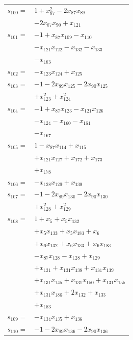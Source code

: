 \begin{longtable}{@{}r@{\;}l@{}}
\(s_{100}=\) & \(\displaystyle 1 +x_{87}^{2} -2x_{87}x_{89}\) \\
 & \(\displaystyle -2x_{87}x_{90} +x_{121}\) \\[3pt]
\(s_{101}=\) & \(\displaystyle -1 +x_{87}x_{109} -x_{110}\) \\
 & \(\displaystyle -x_{121}x_{122} -x_{132} -x_{133}\) \\
 & \(\displaystyle -x_{183}\) \\[3pt]
\(s_{102}=\) & \(\displaystyle -x_{123}x_{124} +x_{125}\) \\[3pt]
\(s_{103}=\) & \(\displaystyle -1 -2x_{89}x_{125} -2x_{90}x_{125}\) \\
 & \(\displaystyle +x_{123}^{2} +x_{124}^{2}\) \\[3pt]
\(s_{104}=\) & \(\displaystyle -1 +x_{87}x_{123} -x_{121}x_{126}\) \\
 & \(\displaystyle -x_{124} -x_{160} -x_{161}\) \\
 & \(\displaystyle -x_{167}\) \\[3pt]
\(s_{105}=\) & \(\displaystyle 1 -x_{87}x_{114} +x_{115}\) \\
 & \(\displaystyle +x_{121}x_{127} +x_{172} +x_{173}\) \\
 & \(\displaystyle +x_{178}\) \\[3pt]
\(s_{106}=\) & \(\displaystyle -x_{128}x_{129} +x_{130}\) \\[3pt]
\(s_{107}=\) & \(\displaystyle -1 -2x_{89}x_{130} -2x_{90}x_{130}\) \\
 & \(\displaystyle +x_{128}^{2} +x_{129}^{2}\) \\[3pt]
\(s_{108}=\) & \(\displaystyle 1 +x_{5} +x_{5}x_{132}\) \\
 & \(\displaystyle +x_{5}x_{133} +x_{5}x_{183} +x_{6}\) \\
 & \(\displaystyle +x_{6}x_{132} +x_{6}x_{133} +x_{6}x_{183}\) \\
 & \(\displaystyle -x_{87}x_{128} -x_{128} +x_{129}\) \\
 & \(\displaystyle +x_{131} +x_{131}x_{138} +x_{131}x_{139}\) \\
 & \(\displaystyle +x_{131}x_{145} +x_{131}x_{150} +x_{131}x_{155}\) \\
 & \(\displaystyle +x_{131}x_{186} +2x_{132} +x_{133}\) \\
 & \(\displaystyle +x_{183}\) \\[3pt]
\(s_{109}=\) & \(\displaystyle -x_{134}x_{135} +x_{136}\) \\[3pt]
\(s_{110}=\) & \(\displaystyle -1 -2x_{89}x_{136} -2x_{90}x_{136}\) \\

\end{longtable}
